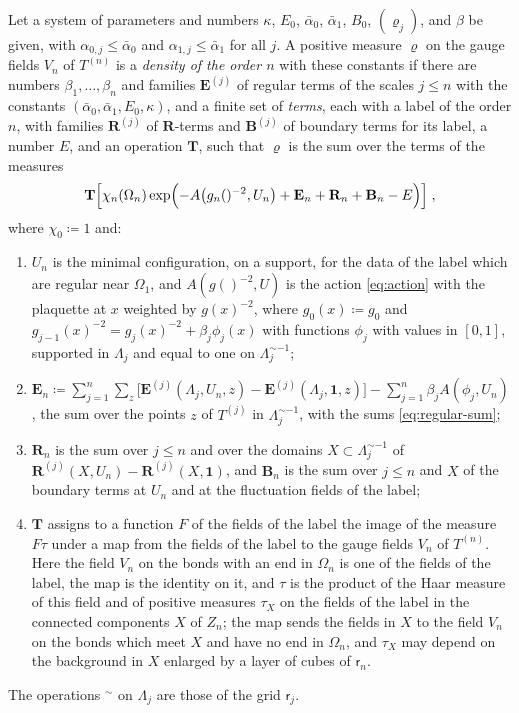 \documentclass[11pt]{preprint}
\makeatletter
\newcommand{\id}{\mathbf 1}
\newcommand*{\bigcdot}{}%
\DeclareRobustCommand*{\bigcdot}{%
	\mathbin{\mathpalette\bigcdot@{}}%
}
\newcommand*{\bigcdot@scalefactor}{.7}
\newcommand*{\bigcdot@widthfactor}{1.15}
\newcommand*{\bigcdot@}[2]{%
	\sbox0{$#1\vcenter{}$}%
	\sbox2{$#1\cdot\m@th$}%
	\hbox to \bigcdot@widthfactor\wd2{%
		\hss
		\raise\ht0\hbox{%
			\scalebox{\bigcdot@scalefactor}{%
				\lower\ht0\hbox{$#1\bullet\m@th$}%
			}%
		}%
		\hss
	}%
}
\numberwithin{equation}{section}
\makeatother
\begin{document}
\begin{definition}\label{def:density}
Let a system of parameters and numbers $\kappa$, $E_0$, $\bar\alpha_0$, $\bar\alpha_1$, $B_0$, $(\varrho_j)$, and $\beta$ be given, with $\alpha_{0,j} \leqslant \bar\alpha_0$ and $\alpha_{1,j} \leqslant \bar\alpha_1$ for all $j$. A positive measure $\varrho$ on the gauge fields $V_n$ of $T^{(n)}$ is a \emph{density of the order $n$} with these constants if there are numbers $\beta_1, \dots, \beta_n$ and families $\mathbf E^{(j)}$ of regular terms of the scales $j \leqslant n$ with the constants $(\bar\alpha_0, \bar\alpha_1, E_0, \kappa)$, and a finite set of \emph{terms}, each with a label of the order $n$, with families $\mathbf R^{(j)}$ of $\mathbf R$-terms and $\mathbf B^{(j)}$ of boundary terms for its label, a number $E$, and an operation $\mathbf T$, such that $\varrho$ is the sum over the terms of the measures
\begin{equation}\label{eq:density}
    \mathbf T\Bigl[\chi_n(\Omega_n)\exp\Bigl(-A\bigl(g_n(\bigcdot)^{-2}, U_n\bigr) + \mathbf E_n + \mathbf R_n + \mathbf B_n - E\Bigr)\Bigr]\;,
\end{equation}
where $\chi_0 \coloneqq 1$ and:
\begin{enumerate}[label=(\roman*)]
\item $U_n$ is the minimal configuration, on a support, for the data of the label which are regular near $\Omega_1$, and $A(g(\bigcdot)^{-2}, U)$ is the action \eqref{eq:action} with the plaquette at $x$ weighted by $g(x)^{-2}$, where $g_0(x) \coloneqq g_0$ and $g_{j-1}(x)^{-2} = g_j(x)^{-2} + \beta_j\phi_j(x)$ with functions $\phi_j$ with values in $[0, 1]$, supported in $\Lambda_j$ and equal to one on $\Lambda_j^{\sim-1}$;
\item $\mathbf E_n \coloneqq \sum_{j=1}^{n}\sum_z\bigl[\mathbf E^{(j)}(\Lambda_j, U_n, z) - \mathbf E^{(j)}(\Lambda_j, \id, z)\bigr] - \sum_{j=1}^n\beta_jA(\phi_j, U_n)$, the sum over the points $z$ of $T^{(j)}$ in $\Lambda_j^{\sim-1}$, with the sums \eqref{eq:regular-sum};
\item $\mathbf R_n$ is the sum over $j \leqslant n$ and over the domains $X \subset \Lambda_j^{\sim-1}$ of $\mathbf R^{(j)}(X, U_n) - \mathbf R^{(j)}(X, \id)$, and $\mathbf B_n$ is the sum over $j \leqslant n$ and $X$ of the boundary terms at $U_n$ and at the fluctuation fields of the label;
\item $\mathbf T$ assigns to a function $F$ of the fields of the label the image of the measure $F\tau$ under a map from the fields of the label to the gauge fields $V_n$ of $T^{(n)}$. Here the field $V_n$ on the bonds with an end in $\Omega_n$ is one of the fields of the label, the map is the identity on it, and $\tau$ is the product of the Haar measure of this field and of positive measures $\tau_X$ on the fields of the label in the connected components $X$ of $Z_n$; the map sends the fields in $X$ to the field $V_n$ on the bonds which meet $X$ and have no end in $\Omega_n$, and $\tau_X$ may depend on the background in $X$ enlarged by a layer of cubes of $\mathsf r_n$.
\end{enumerate}
The operations ${}^\sim$ on $\Lambda_j$ are those of the grid $\mathsf r_j$.
\end{definition}
\end{document}
